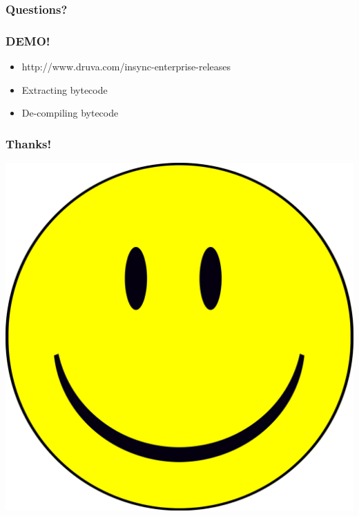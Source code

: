 \documentclass{beamer}
\begin{document}
\begin{frame}
	\frametitle{Questions?}
\end{frame}

\begin{frame}
	\frametitle{DEMO!}
	\begin{itemize}
		\item http://www.druva.com/insync-enterprise-releases
		\item Extracting bytecode
		\item De-compiling bytecode
	\end{itemize}
\end{frame}

\begin{frame}
	\frametitle{Thanks!}
	\begin{center}
		\includegraphics[scale=0.35]{thanks}
	\end{center}
\end{frame}
\end{document}

